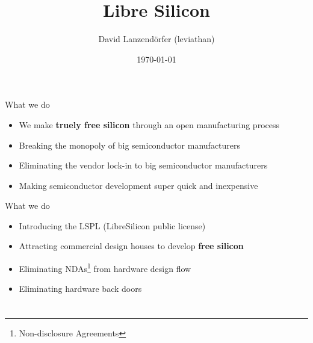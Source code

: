 \documentclass{beamer}
\author{David Lanzendörfer (leviathan)}
\institute{\textit{Lanceville Technologies Group Ltd.}}
\title{Libre Silicon} %
\date{\today} %
\begin{document}
\cjkfont

\begin{frame}
\titlepage %
\end{frame}


\section[What]{}
\begin{frame}{What we do}
	\begin{itemize}
        \setlength\itemsep{1em}
		\item We make \textbf{truely free silicon} through an open manufacturing process
		\item Breaking the monopoly of big semiconductor manufacturers
		\item Eliminating the vendor lock-in to big semiconductor manufacturers
		\item Making semiconductor development super quick and inexpensive
	\end{itemize}
\end{frame}
\begin{frame}{What we do}
	\begin{itemize}
        \setlength\itemsep{1em}
		\item Introducing the LSPL (LibreSilicon public license)
		\item Attracting commercial design houses to develop \textbf{free silicon}
		\item Eliminating NDAs\footnote{Non-disclosure Agreements} from hardware design flow
		\item Eliminating hardware back doors
	\end{itemize}
\end{frame}


\section[Why]{}
\end{document}
